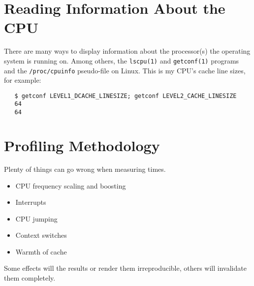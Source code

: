\section{Reading Information About the CPU}
\label{app:cpuinfo}
There are many ways to display information about the processor(s) the operating system is
running on.  Among others, the \texttt{lscpu(1)} and
\texttt{getconf(1)} programs and the \texttt{/proc/cpuinfo}
pseudo-file on Linux.  This is  my CPU's cache
line sizes, for example:
\begin{verbatim}
   $ getconf LEVEL1_DCACHE_LINESIZE; getconf LEVEL2_CACHE_LINESIZE
   64
   64
\end{verbatim}

\section{Profiling Methodology}
Plenty of things can go wrong when measuring  times.
\begin{itemize}
   \item CPU frequency scaling and boosting
   \item Interrupts
   \item CPU jumping
   \item Context switches
   \item Warmth of cache
\end{itemize}
Some effects will  the results or render them irreproducible,
others will invalidate them completely.

